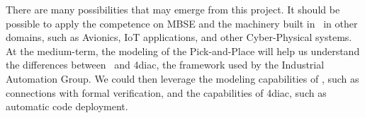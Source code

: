 There are many possibilities that may emerge from this project. It should be possible to apply the competence on MBSE and the machinery built in \autofocus\ in other domains, such as Avionics, IoT applications, and other Cyber-Physical systems. At the medium-term, the modeling of the Pick-and-Place will help us understand the differences between \autofocus\ and 4diac, the framework used by the Industrial Automation Group. We could then leverage the modeling capabilities of \autofocus, such as connections with formal verification, and the capabilities of 4diac, such as automatic code deployment.


 


